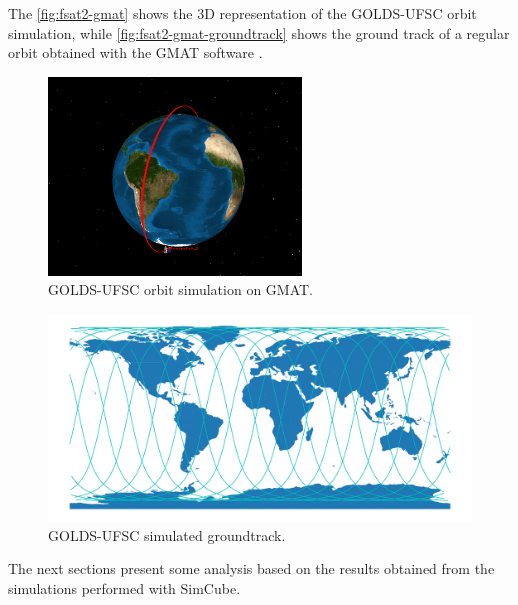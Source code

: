 The \autoref{fig:fsat2-gmat} shows the 3D representation of the GOLDS-UFSC orbit simulation, while \autoref{fig:fsat2-gmat-groundtrack} shows the ground track of a regular orbit obtained with the GMAT software \cite{gmat}.

\begin{figure}[!ht]
    \begin{center}
        \includegraphics[width=0.6\textwidth]{figures/fsat2-gmat.png}
        \caption{GOLDS-UFSC orbit simulation on GMAT.}
        \label{fig:fsat2-gmat}
    \end{center}
\end{figure}

\begin{figure}[!ht]
    \begin{center}
        \includegraphics[width=\textwidth]{figures/fsat2-gmat-groundtrack.pdf}
        \caption{GOLDS-UFSC simulated groundtrack.}
        \label{fig:fsat2-gmat-groundtrack}
    \end{center}
\end{figure}

The next sections present some analysis based on the results obtained from the simulations performed with SimCube.%

